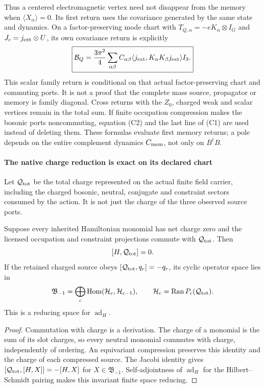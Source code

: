 \documentclass[12pt,a4paper]{article}
\begin{document}
Thus a centered electromagnetic vertex need not disappear from the memory
when $\langle X_\alpha\rangle=0$. Its first return uses the covariance
generated by the same state and dynamics. On a factor-preserving mode chart
with $T_{Q,\alpha}=-eK_\alpha\otimes I_G$ and
$J_c=j_{\rm ext}\otimes U$, its own covariance return is explicitly
\[
 \boxed{
 \mathcal B_Q
 =\frac{3\pi^2}{4}
   \sum_{\alpha\beta}C_{\alpha\beta}
    \langle j_{\rm ext},K_\alpha K_\beta j_{\rm ext}\rangle I_3.}
\]
This scalar family return is conditional on that actual factor-preserving
chart and commuting ports. It is not a proof that the complete mass source,
propagator or memory is family diagonal. Cross returns with the $Z_0$,
charged weak and scalar vertices remain in the total sum.
If finite occupation compression makes the bosonic ports noncommuting,
equation (C2) and the last line of (C1) are used instead of deleting them.
These formulas evaluate first memory returns; a pole depends on the entire
complement dynamics $C_{\rm mem}$, not only on $B^\dagger B$.



\paragraph{The native charge reduction is exact on its declared chart}
Let $\mathcal Q_{\rm tot}$ be the total charge represented on the actual
finite field carrier, including the charged bosonic, neutral, conjugate and
constraint sectors consumed by the action. It is not just the charge of the
three observed source ports.

\begin{proposition}
\label{p4:prop:v2168-equivariant-charge-reduction}
Suppose every inherited Hamiltonian monomial has net charge zero and the
licensed occupation and constraint projections commute with
$\mathcal Q_{\rm tot}$. Then
\[
 [H,\mathcal Q_{\rm tot}]=0.
\]
If the retained charged source obeys
$[\mathcal Q_{\rm tot},q_r]=-q_r$, its cyclic operator space lies in
\[
 \mathfrak B_{-1}
 =\bigoplus_c\operatorname{Hom}(\mathcal H_c,\mathcal H_{c-1}),
 \qquad \mathcal H_c=\operatorname{Ran}P_c(\mathcal Q_{\rm tot}).
\]
This is a reducing space for $\operatorname{ad}_H$.
\end{proposition}
\begin{proof}
Commutation with charge is a derivation. The charge of a monomial is the
sum of its slot charges, so every neutral monomial commutes with charge,
independently of ordering. An equivariant compression preserves this
identity and the charge of each compressed source. The Jacobi identity
gives $[\mathcal Q_{\rm tot},[H,X]]=-[H,X]$ for $X\in\mathfrak B_{-1}$.
Self-adjointness of $\operatorname{ad}_H$ for the Hilbert--Schmidt pairing makes this
invariant finite space reducing.
\end{proof}
\end{document}
